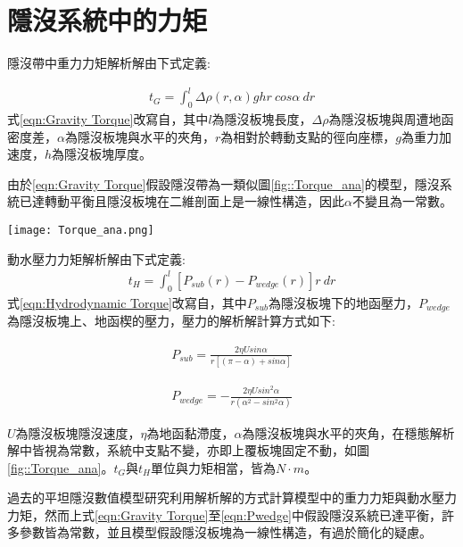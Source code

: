 \section{隱沒系統中的力矩}

隱沒帶中重力力矩解析解由下式定義:

\begin{align}
    t_G=\int^l_0 \Delta\rho(r,\alpha)ghr\ cos\alpha\ dr
    \label{eqn:Gravity Torque}
\end{align}
式\ref{eqn:Gravity Torque}改寫自\citealp{stevenson1977angle}，其中$l$為隱沒板塊長度，$\Delta\rho$為隱沒板塊與周遭地函密度差，$\alpha$為隱沒板塊與水平的夾角，$r$為相對於轉動支點的徑向座標，$g$為重力加速度，$h$為隱沒板塊厚度。

由於\ref{eqn:Gravity Torque}假設隱沒帶為一類似圖\ref{fig::Torque_ana}的模型，隱沒系統已達轉動平衡且隱沒板塊在二維剖面上是一線性構造，因此$\alpha$不變且為一常數。

\begin{figure*}[hb]
    \centering
    \texttt{[image: Torque\_ana.png]}
    \caption[簡易隱沒帶二為剖面示意圖]{簡易隱沒帶二為剖面示意圖。摘自\citealp{stevenson1977angle}。}
    \label{fig::Torque_ana}
\end{figure*}

動水壓力力矩解析解由下式定義:
\begin{align}
    t_H=\int^l_0 [P_{sub}(r)-P_{wedge}(r)]r\ dr
    \label{eqn:Hydrodynamic Torque}
\end{align}
式\ref{eqn:Hydrodynamic Torque}改寫自\citealp{McKenzie1969}，其中$P_{sub}$為隱沒板塊下的地函壓力，$P_{wedge}$為隱沒板塊上、地函楔的壓力，壓力的解析解計算方式如下:

\begin{align}
    P_{sub}=\frac{2 \eta U sin \alpha}{r[(\pi - \alpha)+sin\alpha]}
    \label{eqn:Psub}
\end{align}

\begin{align}
    P_{wedge}=-\frac{2 \eta U sin^{2} \alpha}{r(\alpha^2-sin^2\alpha)}
    \label{eqn:Pwedge}
\end{align}

$U$為隱沒板塊隱沒速度，$\eta$為地函黏滯度，$\alpha$為隱沒板塊與水平的夾角，在穩態解析解中皆視為常數，系統中支點不變，亦即上覆板塊固定不動，如圖\ref{fig::Torque_ana}。$t_G$與$t_H$單位與力矩相當，皆為$N\cdot m$。

過去的平坦隱沒數值模型研究利用解析解的方式計算模型中的重力力矩與動水壓力力矩，然而上式\ref{eqn:Gravity Torque}至\ref{eqn:Pwedge}中假設隱沒系統已達平衡，許多參數皆為常數，並且模型假設隱沒板塊為一線性構造，有過於簡化的疑慮。